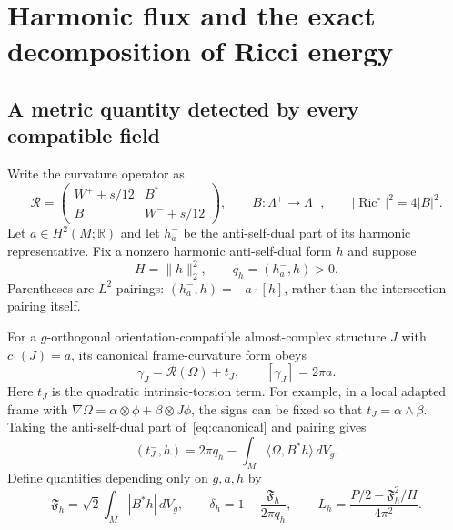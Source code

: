 \documentclass[11pt]{article}
\newcommand{\Ric}{\operatorname{Ric}}
\newcommand{\R}{\mathbb R}
\newcommand{\dd}{\,dV_g}
\theoremstyle{definition}
\theoremstyle{remark}
\begin{document}
\section{Harmonic flux and the exact decomposition of Ricci energy}
\label{sec:flux}

\subsection{A metric quantity detected by every compatible field}

Write the curvature operator as
\begin{equation}
 \mathcal R=
 \begin{pmatrix}W^++s/12&B^*\\B&W^-+s/12\end{pmatrix},
 \qquad B:\Lambda^+\longrightarrow\Lambda^-,
 \qquad |\Ric^\circ|^2=4|B|^2.
 \label{eq:block}
\end{equation}
Let $a\in H^2(M;\R)$ and let $h_a^-$ be the anti-self-dual part of
its harmonic representative. Fix a nonzero harmonic anti-self-dual form $h$
and suppose
\[
 H=\|h\|_2^2,\qquad q_h=(h_a^-,h)>0.
\]
Parentheses are $L^2$ pairings: $(h_a^-,h)=-a\cdot[h]$, rather than
the intersection pairing itself.

For a $g$-orthogonal orientation-compatible almost-complex structure $J$
with $c_1(J)=a$, its canonical frame-curvature form obeys
\begin{equation}
 \gamma_J=\mathcal R(\Omega)+t_J,\qquad
 [\gamma_J]=2\pi a.
 \label{eq:canonical}
\end{equation}
Here $t_J$ is the quadratic intrinsic-torsion term. For example, in a
local adapted frame with
$\nabla\Omega=\alpha\otimes\phi+\beta\otimes J\phi$,
the signs can be fixed so that $t_J=\alpha\wedge\beta$.
Taking the anti-self-dual part of~\eqref{eq:canonical} and pairing gives
\begin{equation}
 (t_J^-,h)=2\pi q_h-\int_M\langle\Omega,B^*h\rangle\dd.
 \label{eq:chern-flux}
\end{equation}
Define quantities depending only on $g,a,h$ by
\begin{equation}
 \mathfrak F_h=\sqrt2\int_M|B^*h|\dd,\qquad
 \delta_h=1-\frac{\mathfrak F_h}{2\pi q_h},\qquad
 L_h=\frac{P/2-\mathfrak F_h^2/H}{4\pi^2}.
 \label{eq:flux-def}
\end{equation}
\end{document}
